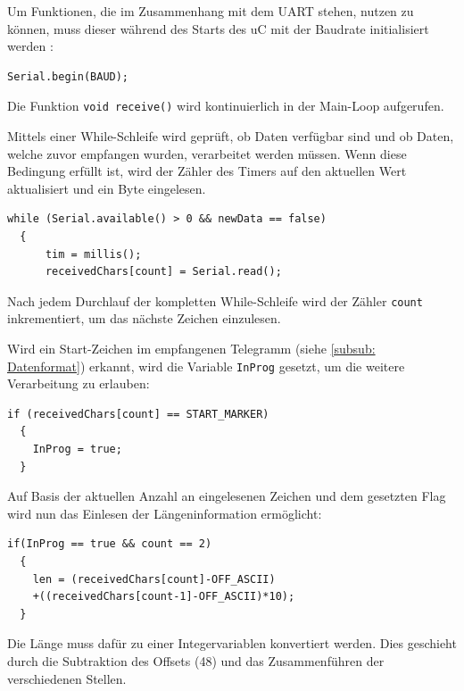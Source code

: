 Um Funktionen, die im Zusammenhang mit dem \ac{UART} stehen, nutzen zu können, muss dieser während des Starts des \ac{uC} mit der Baudrate initialisiert werden \citep{ArduinoRef}:
\begin{lstlisting}[caption={\textit{Konstruktor UART}}]
  Serial.begin(BAUD);
\end{lstlisting}

Die Funktion \lstinline!void receive()! wird kontinuierlich in der Main-Loop aufgerufen.

\smallskip


Mittels einer While-Schleife wird geprüft, ob Daten verfügbar sind und ob Daten, welche zuvor empfangen wurden, verarbeitet werden müssen. Wenn diese Bedingung erfüllt
ist, wird der Zähler des Timers auf den aktuellen Wert aktualisiert und ein Byte eingelesen. 

\begin{lstlisting}[caption={\textit{Prüfen auf neue Daten}}]
  while (Serial.available() > 0 && newData == false)
  {
      tim = millis();
      receivedChars[count] = Serial.read();
\end{lstlisting}

Nach jedem Durchlauf der kompletten While-Schleife wird der Zähler \lstinline!count! inkrementiert, um das nächste Zeichen einzulesen.

\smallskip

Wird ein Start-Zeichen im empfangenen Telegramm (siehe \ref{subsub: Datenformat}) erkannt, wird die Variable \lstinline!InProg! gesetzt, um die weitere Verarbeitung
zu erlauben:

\begin{lstlisting}[caption={\textit{Erkennung Start-Marker}}]
  if (receivedChars[count] == START_MARKER)
  {
    InProg = true;
  }
\end{lstlisting}

Auf Basis der aktuellen Anzahl an eingelesenen Zeichen und dem gesetzten Flag wird nun das Einlesen der Längeninformation ermöglicht:

\begin{lstlisting}[caption={\textit{Einlesen Längeninformation}}]
  if(InProg == true && count == 2)
  {
    len = (receivedChars[count]-OFF_ASCII)
    +((receivedChars[count-1]-OFF_ASCII)*10);
  }
\end{lstlisting}

Die Länge muss dafür zu einer Integervariablen konvertiert werden. Dies geschieht durch die Subtraktion des Offsets (48) und das Zusammenführen der verschiedenen Stellen.

